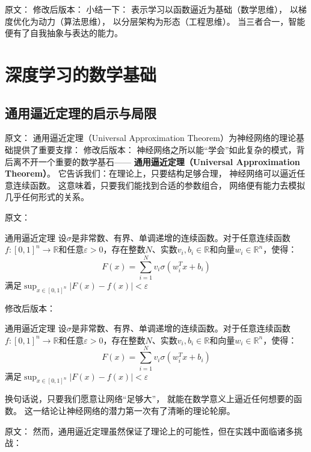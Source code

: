 原文：
修改后版本：
小结一下：  
表示学习以函数逼近为基础（数学思维），  
以梯度优化为动力（算法思维），  
以分层架构为形态（工程思维）。  
当三者合一，智能便有了自我抽象与表达的能力。

\section{深度学习的数学基础}

\subsection{通用逼近定理的启示与局限}

原文：
通用逼近定理（Universal Approximation Theorem）为神经网络的理论基础提供了重要支撑：
修改后版本：
神经网络之所以能“学会”如此复杂的模式，背后离不开一个重要的数学基石——  
\textbf{通用逼近定理（Universal Approximation Theorem）}。  
它告诉我们：在理论上，只要结构足够合理，  
神经网络可以逼近任意连续函数。  
这意味着，只要我们能找到合适的参数组合，  
网络便有能力去模拟几乎任何形式的关系。



原文：
\begin{theorem}[]{通用逼近定理}
设$\sigma$是非常数、有界、单调递增的连续函数。对于任意连续函数$f: [0,1]^n \rightarrow \mathbb{R}$和任意$\varepsilon > 0$，存在整数$N$、实数$v_i, b_i \in \mathbb{R}$和向量$w_i \in \mathbb{R}^n$，使得：
$$F(x) = \sum_{i=1}^{N} v_i \sigma(w_i^T x + b_i)$$
满足$\sup_{x \in [0,1]^n} |F(x) - f(x)| < \varepsilon$
\end{theorem}
修改后版本：
\begin{theorem}[]{通用逼近定理}
设$\sigma$是非常数、有界、单调递增的连续函数。对于任意连续函数$f: [0,1]^n \rightarrow \mathbb{R}$和任意$\varepsilon > 0$，存在整数$N$、实数$v_i, b_i \in \mathbb{R}$和向量$w_i \in \mathbb{R}^n$，使得：
$$F(x) = \sum_{i=1}^{N} v_i \sigma(w_i^T x + b_i)$$
满足$\sup_{x \in [0,1]^n} |F(x) - f(x)| < \varepsilon$
\end{theorem}

换句话说，只要我们愿意让网络“足够大”，  
就能在数学意义上逼近任何想要的函数。  
这一结论让神经网络的潜力第一次有了清晰的理论轮廓。



原文：
然而，通用逼近定理虽然保证了理论上的可能性，但在实践中面临诸多挑战：

